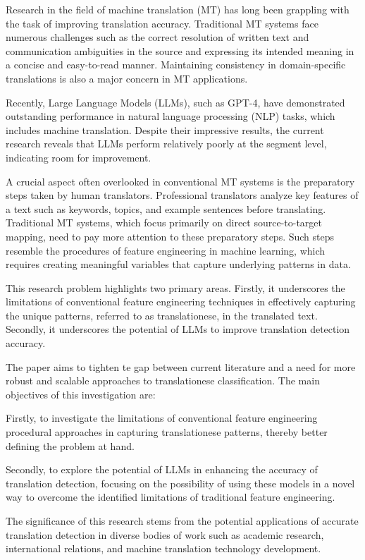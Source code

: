 Research in the field of machine translation (MT) has long been grappling with the task of improving translation accuracy. Traditional MT systems face numerous challenges such as the correct resolution of written text and communication ambiguities in the source and expressing its intended meaning in a concise and easy-to-read manner. Maintaining consistency in domain-specific translations is also a major concern in MT applications.

Recently, Large Language Models (LLMs), such as GPT-4, have demonstrated outstanding performance in natural language processing (NLP) tasks, which includes machine translation. Despite their impressive results, the current research reveals that LLMs perform relatively poorly at the segment level, indicating room for improvement.

A crucial aspect often overlooked in conventional MT systems is the preparatory steps taken by human translators. Professional translators analyze key features of a text such as keywords, topics, and example sentences before translating. Traditional MT systems, which focus primarily on direct source-to-target mapping, need to pay more attention to these preparatory steps. Such steps resemble the procedures of feature engineering in machine learning, which requires creating meaningful variables that capture underlying patterns in data.

This research problem highlights two primary areas. Firstly, it underscores the limitations of conventional feature engineering techniques in effectively capturing the unique patterns, referred to as translationese, in the translated text. Secondly, it underscores the potential of LLMs to improve translation detection accuracy.

The paper aims to tighten te gap between current literature and a need for more robust and scalable approaches to translationese classification. The main objectives of this investigation are:

Firstly, to investigate the limitations of conventional feature engineering procedural approaches in capturing translationese patterns, thereby better defining the problem at hand.

Secondly, to explore the potential of LLMs in enhancing the accuracy of translation detection, focusing on the possibility of using these models in a novel way to overcome the identified limitations of traditional feature engineering.

The significance of this research stems from the potential applications of accurate translation detection in diverse bodies of work such as academic research, international relations, and machine translation technology development.

